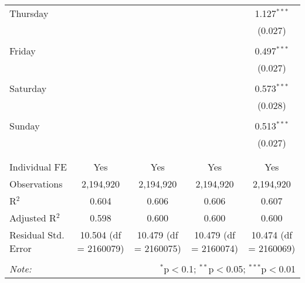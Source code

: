 \documentclass[
]{article}
\begin{document}
\begin{table}[!htbp]
{\begin{tabular}{@{\extracolsep{5pt}}lcccc}
 Thursday &  &  &  & 1.127$^{***}$ \\ 
  &  &  &  & (0.027) \\ 
  & & & & \\ 
 Friday &  &  &  & 0.497$^{***}$ \\ 
  &  &  &  & (0.027) \\ 
  & & & & \\ 
 Saturday &  &  &  & 0.573$^{***}$ \\ 
  &  &  &  & (0.028) \\ 
  & & & & \\ 
 Sunday &  &  &  & 0.513$^{***}$ \\ 
  &  &  &  & (0.027) \\ 
  & & & & \\ 
\hline \\[-1.8ex] 
Individual FE & Yes & Yes & Yes & Yes \\ 
Observations & 2,194,920 & 2,194,920 & 2,194,920 & 2,194,920 \\ 
R$^{2}$ & 0.604 & 0.606 & 0.606 & 0.607 \\ 
Adjusted R$^{2}$ & 0.598 & 0.600 & 0.600 & 0.600 \\ 
Residual Std. Error & 10.504 (df = 2160079) & 10.479 (df = 2160075) & 10.479 (df = 2160074) & 10.474 (df = 2160069) \\ 
\hline 
\hline \\[-1.8ex] 
\textit{Note:}  & \multicolumn{4}{r}{$^{*}$p$<$0.1; $^{**}$p$<$0.05; $^{***}$p$<$0.01} \\ 
\end{tabular}
} 
\end{table} 
\newpage
\end{document}
